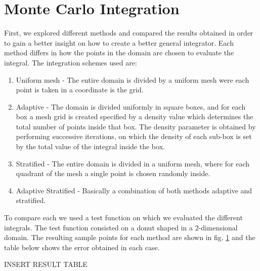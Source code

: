 \section{Monte Carlo Integration}

First, we explored different methods and compared the results obtained
in order to gain a better insight on how to create a better general integrator. Each method differs in how
the points in the domain are chosen to evaluate the integral.
The integration schemes \cite{MCmethods} used are:
\begin{enumerate}
  \item Uniform mesh - The entire domain is divided by a uniform mesh were each point is taken in a coordinate is the grid.
  \item Adaptive - The domain is divided uniformly in square boxes, and for each box a mesh grid is created
  specified by a density value which determines the total number of points inside that box. The density parameter
  is obtained by performing successive iterations, on which the density of each sub-box is set by the total value of the integral inside
  the box.
  \item Stratified - The entire domain is divided in a uniform mesh, where for each quadrant of the mesh
  a single point is chosen randomly inside.
  \item Adaptive Stratified - Basically a combination of both methods adaptive and stratified.
\end{enumerate}

To compare each we used a test function on which we evaluated the different integrals.
The test function consisted on a donut shaped  in a 2-dimensional domain. The resulting
sample points for each method are shown in fig. \ref{} and the table below shows the error
obtained in each case.

INSERT RESULT TABLE
